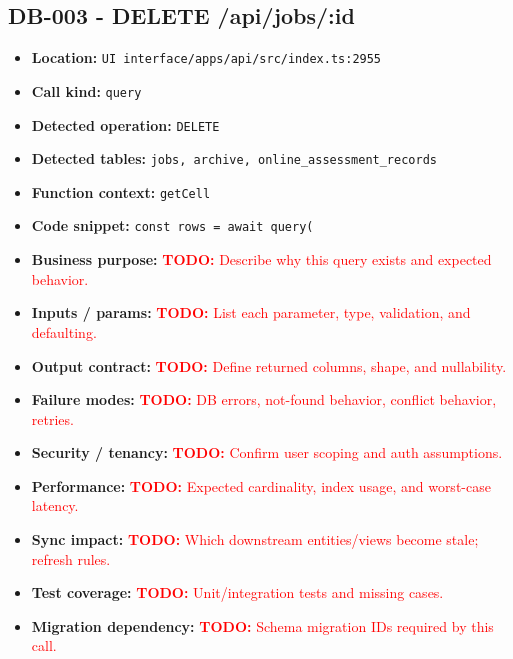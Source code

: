 \documentclass[11pt]{article}
\newcommand{\todoitem}[1]{\textcolor{red}{\textbf{TODO:} #1}}
\begin{document}
\subsection{DB-003 - DELETE /api/jobs/:id}
\begin{itemize}[leftmargin=1.5em]
\item \textbf{Location:} \texttt{UI interface/apps/api/src/index.ts:2955}
\item \textbf{Call kind:} \texttt{query}
\item \textbf{Detected operation:} \texttt{DELETE}
\item \textbf{Detected tables:} \texttt{jobs, archive, online\_assessment\_records}
\item \textbf{Function context:} \texttt{getCell}
\item \textbf{Code snippet:} \texttt{const rows = await query(}
\item \textbf{Business purpose:} \todoitem{Describe why this query exists and expected behavior.}
\item \textbf{Inputs / params:} \todoitem{List each parameter, type, validation, and defaulting.}
\item \textbf{Output contract:} \todoitem{Define returned columns, shape, and nullability.}
\item \textbf{Failure modes:} \todoitem{DB errors, not-found behavior, conflict behavior, retries.}
\item \textbf{Security / tenancy:} \todoitem{Confirm user scoping and auth assumptions.}
\item \textbf{Performance:} \todoitem{Expected cardinality, index usage, and worst-case latency.}
\item \textbf{Sync impact:} \todoitem{Which downstream entities/views become stale; refresh rules.}
\item \textbf{Test coverage:} \todoitem{Unit/integration tests and missing cases.}
\item \textbf{Migration dependency:} \todoitem{Schema migration IDs required by this call.}
\end{itemize}
\end{document}

